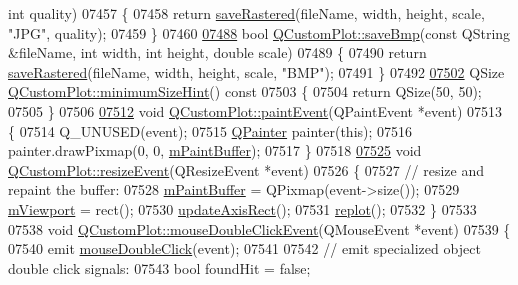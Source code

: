 \begin{DoxyCode}
       \textcolor{keywordtype}{int} quality)
07457 \{
07458   \textcolor{keywordflow}{return} \hyperlink{a00116_ab528b84cf92baabe29b1d0ef2f77c93e}{saveRastered}(fileName, width, height, scale, \textcolor{stringliteral}{"JPG"}, quality);
07459 \}
07460 
\hypertarget{a00115_source_l07488}{}\hyperlink{a00116_a6629d9e8e6da4bf18055ee0257fdce9a}{07488} \textcolor{keywordtype}{bool} \hyperlink{a00116_a6629d9e8e6da4bf18055ee0257fdce9a}{QCustomPlot::saveBmp}(\textcolor{keyword}{const} QString &fileName, \textcolor{keywordtype}{int} width, \textcolor{keywordtype}{int} height, \textcolor{keywordtype}{double} scale)
07489 \{
07490   \textcolor{keywordflow}{return} \hyperlink{a00116_ab528b84cf92baabe29b1d0ef2f77c93e}{saveRastered}(fileName, width, height, scale, \textcolor{stringliteral}{"BMP"});
07491 \}
07492 
\hypertarget{a00115_source_l07502}{}\hyperlink{a00116_a4904f06d831afae29cd5d10e889388c3}{07502} QSize \hyperlink{a00116_a4904f06d831afae29cd5d10e889388c3}{QCustomPlot::minimumSizeHint}()\textcolor{keyword}{ const}
07503 \textcolor{keyword}{}\{
07504   \textcolor{keywordflow}{return} QSize(50, 50);
07505 \}
07506 
\hypertarget{a00115_source_l07512}{}\hyperlink{a00116_a2bbc3b1c24bfcc8a7cc1f3008cdd9b73}{07512} \textcolor{keywordtype}{void} \hyperlink{a00116_a2bbc3b1c24bfcc8a7cc1f3008cdd9b73}{QCustomPlot::paintEvent}(QPaintEvent *event)
07513 \{
07514   Q\_UNUSED(event);
07515   \hyperlink{a00060}{QPainter} painter(\textcolor{keyword}{this});
07516   painter.drawPixmap(0, 0, \hyperlink{a00116_a804ea55d1894964076fe02acf11da591}{mPaintBuffer});
07517 \}
07518 
\hypertarget{a00115_source_l07525}{}\hyperlink{a00116_a13e05523a40c3f08875df5cde85cf0d9}{07525} \textcolor{keywordtype}{void} \hyperlink{a00116_a13e05523a40c3f08875df5cde85cf0d9}{QCustomPlot::resizeEvent}(QResizeEvent *event)
07526 \{
07527   \textcolor{comment}{// resize and repaint the buffer:}
07528   \hyperlink{a00116_a804ea55d1894964076fe02acf11da591}{mPaintBuffer} = QPixmap(event->size());
07529   \hyperlink{a00116_a69feeea9d5254eab8ba7f9be13f85e0b}{mViewport} = rect();
07530   \hyperlink{a00116_a428242419d3a1b63f2cbff637986c35c}{updateAxisRect}();
07531   \hyperlink{a00116_a563540b54b2a09c8ef092d42e9621f42}{replot}();
07532 \}
07533 
07538 \textcolor{keywordtype}{void} \hyperlink{a00116_a467e30feeea8ec0dd35f19ca32a55ba7}{QCustomPlot::mouseDoubleClickEvent}(QMouseEvent *event)
07539 \{
07540   emit \hyperlink{a00116_a9b232142c64fcf273a953ee08e5b90e9}{mouseDoubleClick}(event);
07541   
07542   \textcolor{comment}{// emit specialized object double click signals:}
07543   \textcolor{keywordtype}{bool} foundHit = \textcolor{keyword}{false};

\end{DoxyCode}
